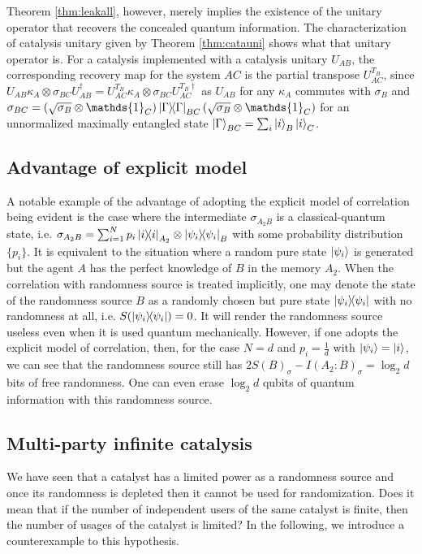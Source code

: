 \documentclass[aps, reprint, amsmath,amssymb, prx, superscriptaddress]{revtex4-2}
\begin{document}
Theorem \ref{thm:leakall}, however, merely implies the existence of the unitary operator that recovers the concealed quantum information. The characterization of catalysis unitary given by Theorem \ref{thm:catauni} shows what that unitary operator is. For a catalysis implemented with a catalysis unitary $U_{AB}$, the corresponding recovery map for the system $AC$ is the partial transpose $U_{AC}^{T_B}$, since $U_{AB}\kappa_A\otimes\sigma_{BC}U_{AB}^\dag=U_{AC}^{T_B}\kappa_A\otimes\sigma_{BC} U_{AC}^{T_B\dag}$ as $U_{AB}$ for any $\kappa_A$ commutes with $\sigma_B$ and $\sigma_{BC}=(\sqrt{\sigma_B}\otimes\mathds{1}_C)\dyad{\Gamma}_{BC}(\sqrt{\sigma_B}\otimes\mathds{1}_C)$ for an unnormalized maximally entangled state $\ket{\Gamma}_{BC}=\sum_i \ket{i}_B\ket{i}_C$.

\subsection{Advantage of explicit model}

A notable example of the advantage of adopting the explicit model of correlation being evident is the case where the intermediate $\sigma_{A_2B}$ is a classical-quantum state, i.e. $\sigma_{A_2B}=\sum_{i=1}^N p_i  \dyad{i}_{A_2}\otimes \dyad{\psi_i}_B$ with some probability distribution $\{p_i\}$. It is equivalent to the situation where a random pure state $\ket{\psi_i}$ is generated but the agent $A$ has the perfect knowledge of $B$ in the memory $A_2$. When the correlation with randomness source is treated implicitly, one may denote the state of the randomness source $B$ as a randomly chosen but pure state $\dyad{\psi_i}$ with no randomness at all, i.e. $S(\dyad{\psi_i})=0$. It will render the randomness source useless even when it is used quantum mechanically. However, if one adopts the explicit model of correlation, then, for the case $N=d$ and $p_i=\frac{1}{d}$ with $\ket{\psi_i}=\ket{i}$, we can see that the randomness source still has $2S(B)_\sigma - I(A_2:B)_\sigma=\log_2  d$ bits of free randomness. One can even erase $\log_2  d$ qubits of quantum information with this randomness source.

\subsection{Multi-party infinite catalysis}

We have seen that a catalyst has a limited power as a randomness source and once its randomness is depleted then it cannot be used for randomization. Does it mean that if the number of independent users of the same catalyst is finite, then the number of usages of the catalyst is limited? In the following, we introduce a counterexample to this hypothesis.
\end{document}
